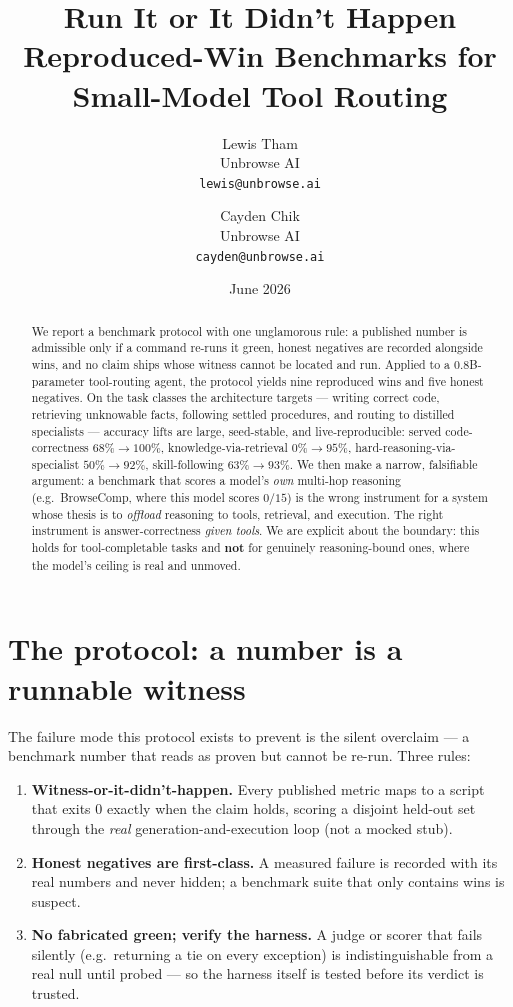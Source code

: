 \documentclass[11pt]{article}
\title{\textbf{Run It or It Didn't Happen}\\
\large Reproduced-Win Benchmarks for Small-Model Tool Routing}
\author{Lewis Tham\\ Unbrowse AI \\ \texttt{lewis@unbrowse.ai}
  \and Cayden Chik\\ Unbrowse AI \\ \texttt{cayden@unbrowse.ai}}
\date{June 2026}
\begin{document}
\maketitle

\begin{abstract}
We report a benchmark protocol with one unglamorous rule: a published number is
admissible only if a command re-runs it green, honest negatives are recorded
alongside wins, and no claim ships whose witness cannot be located and run. Applied to a 0.8B-parameter
tool-routing agent, the protocol yields nine reproduced wins and five honest
negatives. On the task classes the architecture targets --- writing correct code,
retrieving unknowable facts, following settled procedures, and routing to distilled
specialists --- accuracy lifts are large, seed-stable, and live-reproducible: served
code-correctness $68\%\!\to\!100\%$, knowledge-via-retrieval $0\%\!\to\!95\%$,
hard-reasoning-via-specialist $50\%\!\to\!92\%$, skill-following $63\%\!\to\!93\%$.
We then make a narrow, falsifiable argument: a benchmark that scores a model's
\emph{own} multi-hop reasoning (e.g.\ BrowseComp, where this model scores $0/15$) is
the wrong instrument for a system whose thesis is to \emph{offload} reasoning to
tools, retrieval, and execution. The right instrument is answer-correctness
\emph{given tools}. We are explicit about the boundary: this holds for
tool-completable tasks and \textbf{not} for genuinely reasoning-bound ones, where the
model's ceiling is real and unmoved.
\end{abstract}

\section{The protocol: a number is a runnable witness}
The failure mode this protocol exists to prevent is the silent overclaim --- a
benchmark number that reads as proven but cannot be re-run. Three rules:
\begin{enumerate}[leftmargin=1.8em]
  \item \textbf{Witness-or-it-didn't-happen.} Every published metric maps to a
  script that exits $0$ exactly when the claim holds, scoring a disjoint held-out set
  through the \emph{real} generation-and-execution loop (not a mocked stub).
  \item \textbf{Honest negatives are first-class.} A measured failure is recorded
  with its real numbers and never hidden; a benchmark suite that only contains wins
  is suspect.
  \item \textbf{No fabricated green; verify the harness.} A judge or scorer that
  fails silently (e.g.\ returning a tie on every exception) is indistinguishable from
  a real null until probed --- so the harness itself is tested before its verdict is
  trusted.
\end{enumerate}
\end{document}
